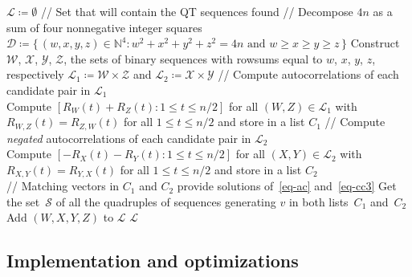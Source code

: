\documentclass[12pt]{article}
\numberwithin{equation}{section}
\newcommand{\N}{\mathbb{N}}
\newcommand{\cL}{{\mathcal L}}
\newcommand{\cS}{{\mathcal S}}
\newcommand{\com}{/\hspace{-1pt}/ }
\begin{document}
\begin{algorithm}
\begin{algorithmic}[1]
\STATE $\cL\coloneqq\emptyset$ \com Set that will contain the QT sequences found
\STATE \com Decompose $4n$ as a sum of four nonnegative integer squares \\
$\mathcal{D}\coloneqq\{\,(w,x,y,z)\in\N^4:w^2+x^2+y^2+z^2=4n\text{ and }w\geq x\geq y\geq z\,\}$ \label{step-decompose}
\STATE Construct $\mathcal W$, $\mathcal X$, $\mathcal Y$, $\mathcal Z$, the sets of binary sequences with rowsums equal to $w$, $x$, $y$, $z$, respectively \label{step-construct-seqs}
\STATE $\cL_1\coloneqq \mathcal W\times\mathcal Z$ and $\cL_2\coloneqq \mathcal X\times\mathcal Y$ \label{step-gen}
\STATE \com Compute autocorrelations of each candidate pair in $\cL_1$ \\
Compute $[R_W(t)+R_Z(t):1\leq t\leq n/2]$ for all $(W,Z)\in\cL_1$ with $R_{W,Z}(t)=R_{Z,W}(t)$ for all $1\leq t\leq n/2$ and store in a list $C_1$ \label{step-store1}
\STATE \com Compute \emph{negated} autocorrelations of each candidate pair in $\cL_2$ \\
Compute $[-R_X(t)-R_Y(t):1\leq t\leq n/2]$ for all $(X,Y)\in\cL_2$ with $R_{X,Y}(t)=R_{Y,X}(t)$ for all $1\leq t\leq n/2$ and store in a list $C_2$ \label{step-store2} \\
\com Matching vectors in $C_1$ and $C_2$ provide solutions of~\eqref{eq-ac} and~\eqref{eq-cc3}
 \label{step-matching}
\STATE Get the set~$\cS$ of all the quadruples of sequences generating $v$ in both lists~$C_1$ and~$C_2$
\FOR{each quadruple $(W,X,Y,Z)$ in $\cS$}
\STATE Add $(W,X,Y,Z)$ to $\cL$ \label{step-add-seq}
\ENDIF
\ENDFOR
\ENDFOR \label{step-end-for}
\ENDFOR
\RETURN $\cL$
\end{algorithmic}
\caption{Algorithm for enumerating QT sequences of a given order~$n$
up to Williamson-type equivalence.
}
\label{alg:qts}
\end{algorithm}

\subsection{Implementation and optimizations}\label{sec:implementation}
\end{document}
